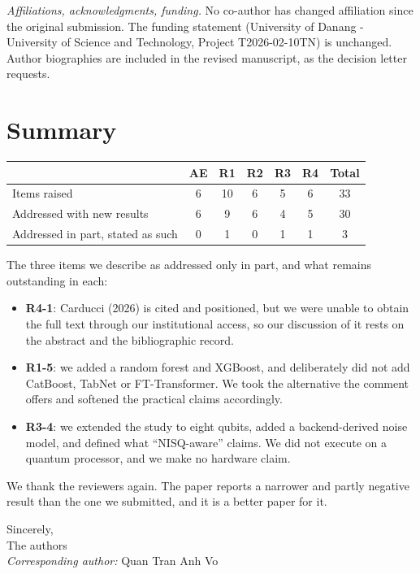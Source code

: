 \documentclass[11pt,a4paper]{article}
\begin{document}
\emph{Affiliations, acknowledgments, funding.} No co-author has changed
affiliation since the original submission. The funding statement (University of
Danang - University of Science and Technology, Project T2026-02-10TN) is
unchanged. Author biographies are included in the revised manuscript, as the
decision letter requests.

\section{Summary}

\begin{center}
\small
\begin{tabular}{@{}lcccccc@{}}
\toprule
& AE & R1 & R2 & R3 & R4 & Total \\
\midrule
Items raised                  & 6 & 10 & 6 & 5 & 6 & 33 \\
Addressed with new results    & 6 &  9 & 6 & 4 & 5 & 30 \\
Addressed in part, stated as such & 0 & 1 & 0 & 1 & 1 & 3 \\
\bottomrule
\end{tabular}
\end{center}

\vspace{4pt}
The three items we describe as addressed only in part, and what remains
outstanding in each:

\begin{itemize}[leftmargin=1.3em,itemsep=2pt,topsep=3pt]
  \item \textbf{R4-1}: Carducci (2026) is cited and positioned, but we were
    unable to obtain the full text through our institutional access, so our
    discussion of it rests on the abstract and the bibliographic record.
  \item \textbf{R1-5}: we added a random forest and XGBoost, and deliberately
    did not add CatBoost, TabNet or FT-Transformer. We took the alternative the
    comment offers and softened the practical claims accordingly.
  \item \textbf{R3-4}: we extended the study to eight qubits, added a
    backend-derived noise model, and defined what ``NISQ-aware'' claims. We did
    not execute on a quantum processor, and we make no hardware claim.
\end{itemize}

We thank the reviewers again. The paper reports a narrower and partly negative
result than the one we submitted, and it is a better paper for it.

\vspace{10pt}
Sincerely,\\[4pt]
The authors\\
\emph{Corresponding author:} Quan Tran Anh Vo
\end{document}
